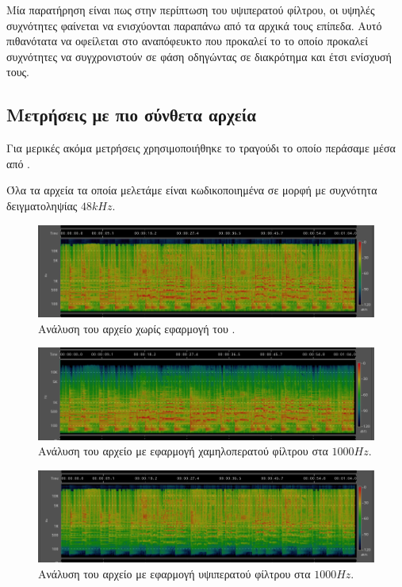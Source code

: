\documentclass[12pt]{extarticle}
\begin{document}
Μία παρατήρηση είναι πως στην περίπτωση του υψιπερατού φίλτρου, οι υψηλές συχνότητες φαίνεται 
να ενισχύονται παραπάνω από τα αρχικά τους επίπεδα. Αυτό πιθανότατα να οφείλεται στο αναπόφευκτο 
που προκαλεί το  το οποίο προκαλεί συχνότητες να συγχρονιστούν σε φάση οδηγώντας σε διακρότημα
και έτσι ενίσχυσή τους.

\subsection{Μετρήσεις με πιο σύνθετα αρχεία}
Για μερικές ακόμα μετρήσεις χρησιμοποιήθηκε το τραγούδι  
το οποίο περάσαμε μέσα από . 

Όλα τα αρχεία τα οποία μελετάμε είναι κωδικοποιημένα σε μορφή  με συχνότητα δειγματοληψίας $48kHz$.

\begin{figure}[!h]
    \centering
    \includegraphics[width=\textwidth]{./assets/session.png}
    \caption{Ανάλυση του αρχείο  χωρίς εφαρμογή του .}
    \label{fig:sessionanalysis}
\end{figure}

\begin{figure}[!h]
    \centering
    \includegraphics[width=\textwidth]{./assets/session_1000_lp.png}
    \caption{Ανάλυση του αρχείο  με εφαρμογή χαμηλοπερατού φίλτρου στα $1000Hz$.}
    \label{fig:sessionanalysislp1000}
\end{figure}

\begin{figure}[H]
    \centering
    \includegraphics[width=\textwidth]{./assets/session_1000_hp.png}
    \caption{Ανάλυση του αρχείο  με εφαρμογή υψιπερατού φίλτρου στα $1000Hz$.}
    \label{fig:sessionanalysishp1000}
\end{figure}
\end{document}
